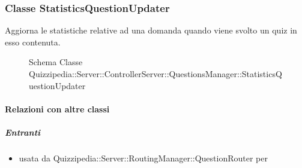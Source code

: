 \subsubsection{Classe StatisticsQuestionUpdater}
Aggiorna le statistiche relative ad una domanda quando viene svolto un quiz in esso contenuta.
\begin{figure}[H]
\centering
\noindent{}
\caption[Schema Classe StatisticsQuestionUpdater]{Schema Classe Quizzipedia::Server::ControllerServer::QuestionsManager::StatisticsQuestionUpdater}
\end{figure}
\paragraph{Relazioni con altre classi}
\subparagraph{Entranti}
\begin{itemize}
\item usata da Quizzipedia::Server::RoutingManager::QuestionRouter per 
\end{itemize}
